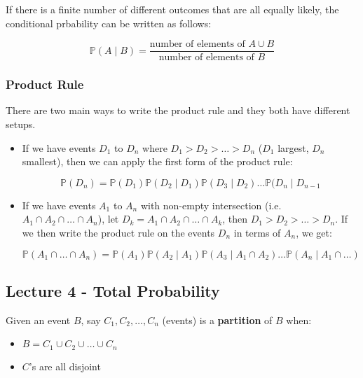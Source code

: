 \documentclass{article}
\begin{document}
If there is a finite number of different outcomes that are all equally
likely, the conditional prbability can be written as follows:

\begin{equation}
  \boxed{
    \mathbb{P}(A \mid B) = \frac{\text{number of elements of } A \cup
      B}{\text{number of elements of } B}
  }
\end{equation}

\subsubsection{Product Rule}

There are two main ways to write the product rule and they both have
different setups.

\begin{itemize}
\item If we have events $D_1$ to $D_n$ where $D_1 > D_2 > \dots > D_n$
  ($D_1$ largest, $D_n$ smallest), then we can apply the first form of
  the product rule:

  \begin{equation}
    \tag{Product Rule 1}
    \boxed{
      \mathbb{P}(D_n) = \mathbb{P}(D_1) \mathbb{P}(D_2 \mid D_1)
      \mathbb{P}(D_3 \mid D_2) \dots \mathbb{P}(D_n \mid D_{n-1}
    }
  \end{equation}

\item If we have events $A_1$ to $A_n$ with non-empty intersection
  (i.e. $A_1 \cap A_2 \cap \dots \cap A_n$), let $D_k = A_1 \cap A_2
  \cap \dots \cap A_k$, then $D_1 > D_2 > \dots > D_n$. If we then
  write the product rule on the events $D_n$ in terms of $A_n$, we
  get:

  \begin{equation}
    \tag{Product Rule 2}
    \boxed{
      \mathbb{P}(A_1 \cap \dots \cap A_n) = \mathbb{P}(A_1)
      \mathbb{P}(A_2 \mid A_1) \mathbb{P}(A_3 \mid A_1 \cap A_2) \dots
      \mathbb{P}(A_n \mid A_1 \cap \dots)
    }
  \end{equation}
\end{itemize}


\subsection{Lecture 4 - Total Probability}

Given an event $B$, say $C_1, C_2, \dots, C_n$ (events) is a
\textbf{partition} of $B$ when:
\begin{itemize}
\item $B = C_1 \cup C_2 \cup \dots \cup C_n$
\item $C$'s are all disjoint
\end{itemize}
\end{document}
